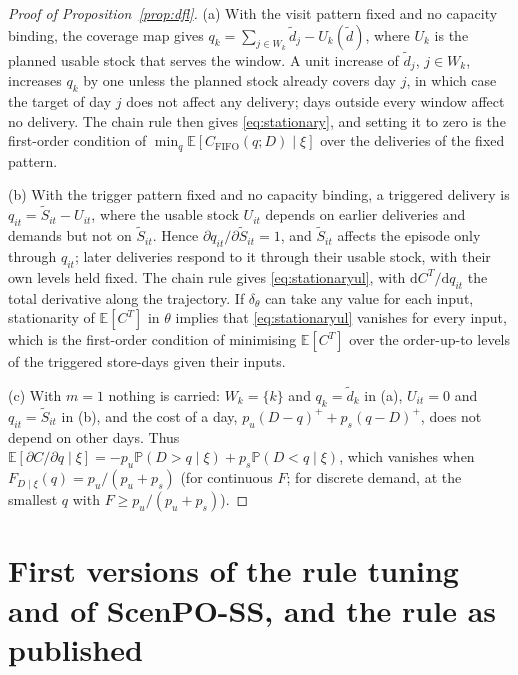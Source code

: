 \begin{proof}[Proof of Proposition~\ref{prop:dfl}]
(a) With the visit pattern fixed and no capacity binding, the coverage map gives $q_k=\sum_{j\in W_k}\tilde d_j-U_k(\tilde d)$, where $U_k$ is the planned usable stock that serves the window. A unit increase of $\tilde d_j$, $j\in W_k$, increases $q_k$ by one unless the planned stock already covers day $j$, in which case the target of day $j$ does not affect any delivery; days outside every window affect no delivery. The chain rule then gives \eqref{eq:stationary}, and setting it to zero is the first-order condition of $\min_q \mathbb E[C_{\mathrm{FIFO}}(q;D)\mid\xi]$ over the deliveries of the fixed pattern.

(b) With the trigger pattern fixed and no capacity binding, a triggered delivery is $q_{it}=\tilde S_{it}-U_{it}$, where the usable stock $U_{it}$ depends on earlier deliveries and demands but not on $\tilde S_{it}$. Hence $\partial q_{it}/\partial\tilde S_{it}=1$, and $\tilde S_{it}$ affects the episode only through $q_{it}$; later deliveries respond to it through their usable stock, with their own levels held fixed. The chain rule gives \eqref{eq:stationaryul}, with $\mathrm dC^{T}/\mathrm dq_{it}$ the total derivative along the trajectory. If $\delta_\theta$ can take any value for each input, stationarity of $\mathbb E[C^{T}]$ in $\theta$ implies that \eqref{eq:stationaryul} vanishes for every input, which is the first-order condition of minimising $\mathbb E[C^{T}]$ over the order-up-to levels of the triggered store-days given their inputs.

(c) With $m=1$ nothing is carried: $W_k=\{k\}$ and $q_k=\tilde d_k$ in (a), $U_{it}=0$ and $q_{it}=\tilde S_{it}$ in (b), and the cost of a day, $p_u(D-q)^++p_s(q-D)^+$, does not depend on other days. Thus $\mathbb E[\partial C/\partial q\mid\xi]=-p_u\mathbb P(D>q\mid\xi)+p_s\mathbb P(D<q\mid\xi)$, which vanishes when $F_{D\mid\xi}(q)=p_u/(p_u+p_s)$ (for continuous $F$; for discrete demand, at the smallest $q$ with $F\ge p_u/(p_u+p_s)$).
\end{proof}

\section{First versions of the rule tuning and of ScenPO-SS, and the rule as published}\label{app:variants}


